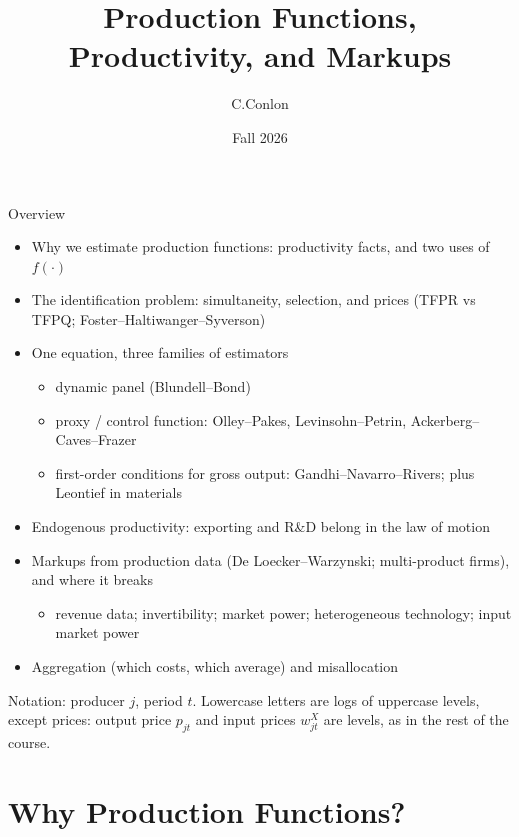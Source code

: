 \documentclass[aspectratio=169,10pt]{beamer}
\title{Production Functions, Productivity, and Markups}
\author{C.Conlon}
\institute{Grad IO}
\date{Fall 2026}
\begin{document}
\frame{\titlepage}

\begin{frame}{Overview}
\begin{itemize}
\item Why we estimate production functions: productivity facts, and two uses of $f(\cdot)$
\item The identification problem: simultaneity, selection, and prices (TFPR vs TFPQ; Foster--Haltiwanger--Syverson)
\item One equation, three families of estimators
\begin{itemize}
\item dynamic panel (Blundell--Bond)
\item proxy / control function: Olley--Pakes, Levinsohn--Petrin, Ackerberg--Caves--Frazer
\item first-order conditions for gross output: Gandhi--Navarro--Rivers; plus Leontief in materials
\end{itemize}
\item Endogenous productivity: exporting and R\&D belong in the law of motion
\item Markups from production data (De Loecker--Warzynski; multi-product firms), and where it breaks
\begin{itemize}
\item revenue data; invertibility; market power; heterogeneous technology; input market power
\end{itemize}
\item Aggregation (which costs, which average) and misallocation
\end{itemize}
\vfill
{\footnotesize Notation: producer $j$, period $t$. Lowercase letters are logs of uppercase levels, \alert{except prices}: output price $p_{jt}$ and input prices $w^X_{jt}$ are levels, as in the rest of the course.}
\end{frame}


\section{Why Production Functions?}
\end{document}
